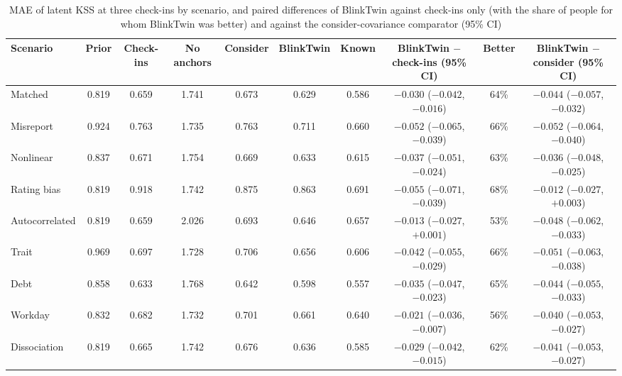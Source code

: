 \documentclass[journal]{IEEEtran}
\begin{document}
\begin{table}[t]
  \centering
  \caption{MAE of latent KSS at three check-ins by scenario, and paired differences of BlinkTwin against check-ins only (with the share of people for whom BlinkTwin was better) and against the consider-covariance comparator (95\% CI)}
  \label{tab:scenarios}
  \footnotesize
  \setlength{\tabcolsep}{3pt}
  \scriptsize
  \begin{tabular}{@{}lccccccccc@{}}
    \toprule
    Scenario & Prior & Check-ins & No anchors & Consider & BlinkTwin & Known & BlinkTwin $-$ check-ins (95\% CI) & Better & BlinkTwin $-$ consider (95\% CI) \\
    \midrule
    Matched & 0.819 & 0.659 & 1.741 & 0.673 & 0.629 & 0.586 & $-0.030$ ($-0.042$, $-0.016$) & 64\% & $-0.044$ ($-0.057$, $-0.032$) \\
    Misreport & 0.924 & 0.763 & 1.735 & 0.763 & 0.711 & 0.660 & $-0.052$ ($-0.065$, $-0.039$) & 66\% & $-0.052$ ($-0.064$, $-0.040$) \\
    Nonlinear & 0.837 & 0.671 & 1.754 & 0.669 & 0.633 & 0.615 & $-0.037$ ($-0.051$, $-0.024$) & 63\% & $-0.036$ ($-0.048$, $-0.025$) \\
    Rating bias & 0.819 & 0.918 & 1.742 & 0.875 & 0.863 & 0.691 & $-0.055$ ($-0.071$, $-0.039$) & 68\% & $-0.012$ ($-0.027$, $+0.003$) \\
    Autocorrelated & 0.819 & 0.659 & 2.026 & 0.693 & 0.646 & 0.657 & $-0.013$ ($-0.027$, $+0.001$) & 53\% & $-0.048$ ($-0.062$, $-0.033$) \\
    Trait & 0.969 & 0.697 & 1.728 & 0.706 & 0.656 & 0.606 & $-0.042$ ($-0.055$, $-0.029$) & 66\% & $-0.051$ ($-0.063$, $-0.038$) \\
    Debt & 0.858 & 0.633 & 1.768 & 0.642 & 0.598 & 0.557 & $-0.035$ ($-0.047$, $-0.023$) & 65\% & $-0.044$ ($-0.055$, $-0.033$) \\
    Workday & 0.832 & 0.682 & 1.732 & 0.701 & 0.661 & 0.640 & $-0.021$ ($-0.036$, $-0.007$) & 56\% & $-0.040$ ($-0.053$, $-0.027$) \\
    Dissociation & 0.819 & 0.665 & 1.742 & 0.676 & 0.636 & 0.585 & $-0.029$ ($-0.042$, $-0.015$) & 62\% & $-0.041$ ($-0.053$, $-0.027$) \\
    \bottomrule
  \end{tabular}
\end{table}
\end{document}
